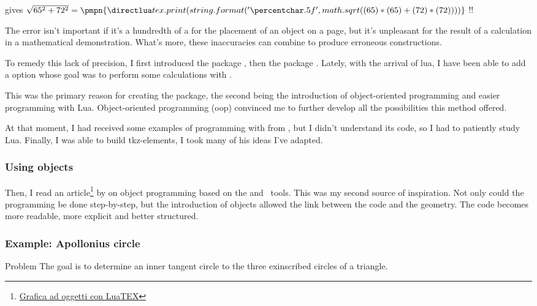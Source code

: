 gives 
\tkzHand $\sqrt{65^2+72^2} = \pmpn{\luaveclen{65}{72}} $ {\color{red}!!}

The error isn't important if it's a hundredth of a  for the placement of an object on a page, but it's unpleasant for the result of a calculation in a mathematical demonstration. What's more, these inaccuracies can combine to produce erroneous constructions.

\vspace{.5em}
To remedy this lack of precision, I first introduced the package , then the package . Lately, with the arrival of lua\LATEX{}, I have been able to add a  option whose goal was to perform some calculations with .

This was the primary reason for creating the package, the second being the introduction of object-oriented programming and easier programming with Lua. Object-oriented programming (oop) convinced me to further develop all the possibilities this method offered.

At that moment, I had received some examples of programming with  from {}, but I didn't understand its code, so I had to patiently study Lua. Finally, I was able to build tkz-elements,  I took many of his ideas I've adapted.


\subsubsection{Using objects} %
\label{ssub:using_objects}

Then, I read an article\footnote{\href{https://www.guitex.org/home/images/meeting2012/slides/presentazione_giacomell_guitmeeting_2012.pdf}{Grafica ad oggetti con LuaTEX}} by  on object programming based on the  and \TIKZ\ tools. This was my second source of inspiration. Not only could the programming be done step-by-step, but the introduction of objects allowed the link between the code and the geometry. The code becomes more readable,  more explicit and better structured. 
 
\subsubsection{Example: Apollonius circle} %
\label{ssub:example_apollonius_circle}

\begin{mybox}{Problem}
The goal is to determine an inner tangent circle to the three exinscribed circles of a triangle. 
\end{mybox}

